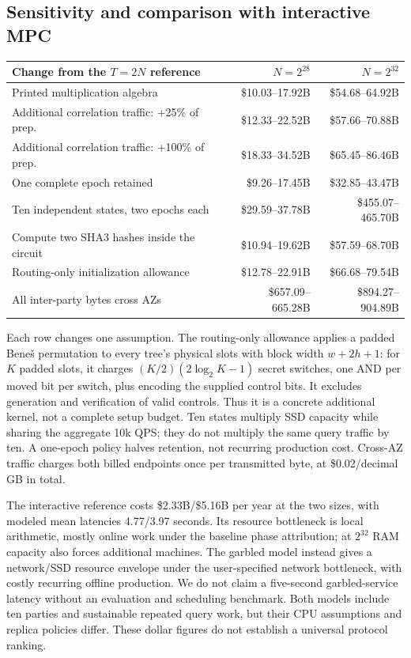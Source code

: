 \subsection{Sensitivity and comparison with interactive MPC}
\begin{center}\small\begin{tabularx}{\linewidth}{Xrr}\toprule
Change from the $T=2N$ reference & $N=2^{28}$ & $N=2^{32}$\\\midrule
Printed multiplication algebra & \$10.03--17.92B & \$54.68--64.92B \\
Additional correlation traffic: +25\% of prep. & \$12.33--22.52B & \$57.66--70.88B \\
Additional correlation traffic: +100\% of prep. & \$18.33--34.52B & \$65.45--86.46B \\
One complete epoch retained & \$9.26--17.45B & \$32.85--43.47B \\
Ten independent states, two epochs each & \$29.59--37.78B & \$455.07--465.70B \\
Compute two SHA3 hashes inside the circuit & \$10.94--19.62B & \$57.59--68.70B \\
Routing-only initialization allowance & \$12.78--22.91B & \$66.68--79.54B \\
All inter-party bytes cross AZs & \$657.09--665.28B & \$894.27--904.89B \\
\bottomrule\end{tabularx}\end{center}
Each row changes one assumption. The routing-only allowance applies a padded
Bene\v{s} permutation to every tree's physical slots with block width
$w+2h+1$: for $K$ padded slots, it charges $(K/2)(2\log_2 K-1)$ secret switches,
one AND per moved bit per switch, plus encoding the supplied control bits.
It excludes generation and verification of valid controls. Thus it is a concrete additional kernel, not a complete setup
budget. Ten states multiply SSD capacity while sharing the aggregate 10k QPS;
they do not multiply the same query traffic by ten. A one-epoch policy halves
retention, not recurring production cost. Cross-AZ traffic charges both billed
endpoints once per transmitted byte, at \$0.02/decimal GB in total.

The interactive reference costs \$2.33B/\$5.16B per year at the two sizes, with
modeled mean latencies 4.77/3.97 seconds. Its resource bottleneck is local
arithmetic, mostly online work under the baseline phase attribution; at $2^{32}$ RAM capacity also forces additional
machines. The garbled model instead gives a network/SSD resource envelope under
the user-specified network bottleneck, with costly recurring offline production.
We do not claim a five-second garbled-service latency without an evaluation and
scheduling benchmark. Both models include ten parties and sustainable repeated
query work, but their CPU assumptions and replica policies differ. These dollar
figures do not establish a universal protocol ranking.

